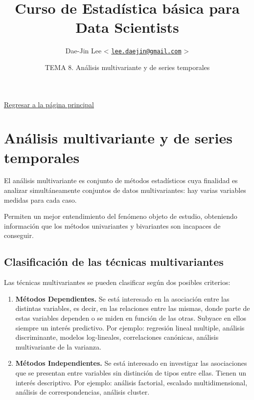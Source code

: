 \documentclass[]{article}
\title{\textbf{Curso de Estadística básica para Data Scientists}}
\author{Dae-Jin Lee \textless{}
\href{mailto:lee.daejin@gmail.com}{\nolinkurl{lee.daejin@gmail.com}}
\textgreater{}}
\date{TEMA 8. Análisis multivariante y de series temporales}
\numberwithin{equation}{section}
\begin{document}
\maketitle

{
\hypersetup{linkcolor=black}
\setcounter{tocdepth}{2}
\tableofcontents
}
\newpage

\href{https://idaejin.github.io/bcam-courses/R/datahack/}{Regresar a la
página principal}

\section{Análisis multivariante y de series
temporales}\label{analisis-multivariante-y-de-series-temporales}

El análisis multivariante es conjunto de métodos estadísticos cuya
finalidad es analizar simultáneamente conjuntos de datos multivariantes:
hay varias variables medidas para cada caso.

Permiten un mejor entendimiento del fenómeno objeto de estudio,
obteniendo información que los métodos univariantes y bivariantes son
incapaces de conseguir.

\subsection{Clasificación de las técnicas
multivariantes}\label{clasificacion-de-las-tecnicas-multivariantes}

Las técnicas multivariantes se pueden clasificar según dos posibles
criterios:

\begin{enumerate}
\def\labelenumi{\arabic{enumi}.}
\item
  \textbf{Métodos Dependientes.} Se está interesado en la asociación
  entre las distintas variables, es decir, en las relaciones entre las
  mismas, donde parte de estas variables dependen o se miden en función
  de las otras. Subyace en ellos siempre un interés predictivo. Por
  ejemplo: regresión lineal multiple, análisis discriminante, modelos
  log-lineales, correlaciones canónicas, análisis multivariante de la
  varianza.
\item
  \textbf{Métodos Independientes.} Se está interesado en investigar las
  asociaciones que se presentan entre variables sin distinción de tipos
  entre ellas. Tienen un interés descriptivo. Por ejemplo: análisis
  factorial, escalado multidimensional, análisis de correspondencias,
  análisis cluster.
\end{enumerate}
\end{document}
